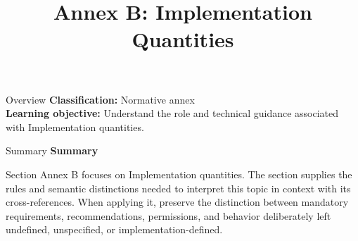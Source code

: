 \documentclass[10pt,letterpaper]{article}
\title{Annex B: Implementation Quantities}
\author{}
\date{}
\begin{document}
\maketitle
\begin{CornellOverviewBox}{Overview}
\textbf{Classification:} Normative annex\\[2pt]
\textbf{Learning objective:} Understand the role and technical guidance associated with Implementation quantities.
\end{CornellOverviewBox}\begin{CornellSummaryBox}{Summary}
{\sffamily\bfseries\color{Accent} Summary}\par\vspace{3pt}Section Annex B focuses on Implementation quantities. The section supplies the rules and semantic distinctions needed to interpret this topic in context with its cross-references. When applying it, preserve the distinction between mandatory requirements, recommendations, permissions, and behavior deliberately left undefined, unspecified, or implementation-defined.
\end{CornellSummaryBox}
\end{document}
